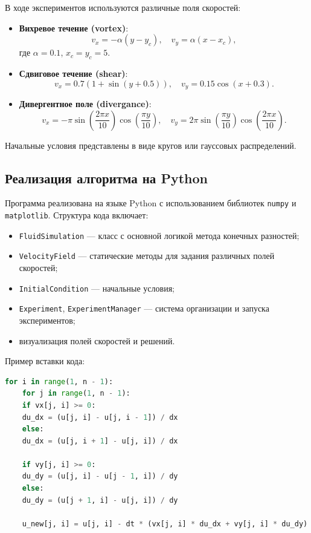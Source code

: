 В ходе экспериментов используются различные поля скоростей:
\begin{itemize}
	\item \textbf{Вихревое течение (vortex)}:
	\begin{equation}
			v_x = -\alpha (y - y_c), \quad v_y = \alpha (x - x_c),
			\label{eq:vortex}
	\end{equation}
	где \(\alpha = 0.1\), \(x_c = y_c = 5\).
	
	\item \textbf{Сдвиговое течение (shear)}:
	\begin{equation}
			v_x = 0.7(1 + \sin(y + 0.5)), \quad v_y = 0.15 \cos(x + 0.3).
			\label{eq:shear}
	\end{equation}

	
	\item \textbf{Дивергентное поле (divergance)}:
	\begin{equation}
			v_x = -\pi \sin\left( \frac{2\pi x}{10} \right) \cos\left( \frac{\pi y}{10} \right), \quad
		v_y = 2\pi \sin\left( \frac{\pi y}{10} \right) \cos\left( \frac{2\pi x}{10} \right).
		\label{eq:div}
	\end{equation}

\end{itemize}

Начальные условия представлены в виде кругов или гауссовых распределений.

\subsection{Реализация алгоритма на Python}

Программа реализована на языке Python с использованием библиотек \texttt{numpy} и \texttt{matplotlib}. Структура кода включает:
\begin{itemize}
	\item \texttt{FluidSimulation} — класс с основной логикой метода конечных разностей;
	\item \texttt{VelocityField} — статические методы для задания различных полей скоростей;
	\item \texttt{InitialCondition} — начальные условия;
	\item \texttt{Experiment}, \texttt{ExperimentManager} — система организации и запуска экспериментов;
	\item визуализация полей скоростей и решений.
\end{itemize}

Пример вставки кода:
\begin{lstlisting}[language=Python, caption={Основной цикл аппроксимации переноса}, label={lst:fd_loop}]
	for i in range(1, n - 1):
	for j in range(1, n - 1):
	if vx[j, i] >= 0:
	du_dx = (u[j, i] - u[j, i - 1]) / dx
	else:
	du_dx = (u[j, i + 1] - u[j, i]) / dx
	
	if vy[j, i] >= 0:
	du_dy = (u[j, i] - u[j - 1, i]) / dy
	else:
	du_dy = (u[j + 1, i] - u[j, i]) / dy
	
	u_new[j, i] = u[j, i] - dt * (vx[j, i] * du_dx + vy[j, i] * du_dy)
\end{lstlisting}



